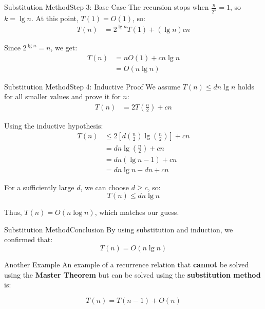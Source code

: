 \documentclass{beamer}
\begin{document}
\begin{frame}{Substitution Method}{Step 3: Base Case}
    The recursion stops when $\frac{n}{2^k} = 1$, so $k = \lg n$. At this point, $T(1) = O(1)$, so:
    \begin{align*}
    T(n) &= 2^{\lg n} T(1) + (\lg n)cn
    \end{align*}

    Since $2^{\lg n} = n$, we get:
    \begin{align*}
    T(n) &= n O(1) + cn \lg n \\
        &= O(n \lg n)
    \end{align*}
\end{frame}

\begin{frame}{Substitution Method}{Step 4: Inductive Proof}
    \footnotesize
    We assume $T(n) \leq dn \lg n$ holds for all smaller values and prove it for $n$:
    \begin{align*}
    T(n) &= 2T\left(\frac{n}{2}\right) + cn
    \end{align*}

    Using the inductive hypothesis:
    \begin{align*}
    T(n) &\leq 2 \left[ d \left(\frac{n}{2}\right) \lg \left(\frac{n}{2}\right) \right] + cn \\
        &= d n \lg \left( \frac{n}{2} \right) + cn \\
        &= d n (\lg n - 1) + cn \\
        &= d n \lg n - d n + cn
    \end{align*}

    For a sufficiently large $d$, we can choose $d \geq c$, so:
    \begin{equation*}
    T(n) \leq d n \lg n
    \end{equation*}

    Thus, $T(n) = O(n \log n)$, which matches our guess.
\end{frame}

\begin{frame}{Substitution Method}{Conclusion}
    By using substitution and induction, we confirmed that:
    \begin{equation*}
    T(n) = O(n \lg n)
    \end{equation*}
\end{frame}

\begin{frame}{Another Example}
    An example of a recurrence relation that \textbf{cannot} be solved using the \textbf{Master Theorem} but can be solved using the \textbf{substitution method} is:

    $$
        T(n) = T(n-1) + O(n)
    $$
\end{frame}
\end{document}

